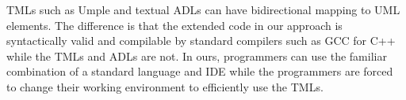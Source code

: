 \noindent
{} TMLs such as Umple \cite{lethbridge2010umplification} and textual ADLs can have bidirectional mapping to UML elements.
The difference is that the extended code in our approach is syntactically valid and compilable by standard compilers such as GCC for C++ while the TMLs and ADLs are not.
In ours, programmers can use the familiar combination of a standard language and IDE \cite{foster2016} while the programmers are forced to change their working environment to efficiently use the TMLs.


\begin{comment}
\begin{itemize}[\footnotesize]
	\item RAOES adapts USM features to existing programming languages while Umple or TextUML does inversely, hence RAOES profits all benefices of IDEs such as intelligent completion and easy to implement. Furthermore, RAOES allows to use all specific C++ features such as function pointers for program efficiency, which are not available in the the TMLs.
	
	\item In RAOES, the programmers write and maintain the USM-based behavior part in the same class/file containing the active class.
	
	\item RAOES support full USM features.
	
	\item RAOES automatically synchronizes the code with the system model specified by UML.
	
	\item RAOES defines the state machine topology separately from the transition table and event definition.
\end{itemize}
\end{comment}

